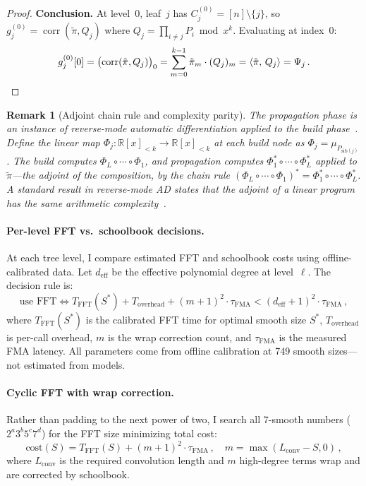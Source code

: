 \documentclass[11pt]{article}
\newtheorem{remark}[theorem]{Remark}
\DeclareMathOperator{\corr}{corr}
\newcommand{\ip}[2]{\langle #1,\, #2 \rangle}
\begin{document}
\begin{proof}
\textbf{Conclusion.} At level~$0$, leaf~$j$ has
$C_j^{(0)} = [n] \setminus \{j\}$, so
$g^{(0)}_j = \corr(\tilde\pi, Q_j)$ where $Q_j = \prod_{i \ne j} P_i
\bmod x^k$.  Evaluating at index~$0$:
\[
  g^{(0)}_j[0]
  = \bigl(\corr(\tilde\pi, Q_j)\bigr)_0
  = \sum_{m=0}^{k-1} \tilde\pi_m \cdot (Q_j)_m
  = \ip{\tilde\pi}{Q_j}
  = \Psi_j\,.\qedhere
\]
\end{proof}

\begin{remark}[Adjoint chain rule and complexity parity]
\label{rem:adjoint-chain}
The propagation phase is an instance of reverse-mode automatic
differentiation applied to the build phase~\citep{griewank2008}.
Define the linear map $\Phi_j \colon \mathbb{R}[x]_{<k} \to
\mathbb{R}[x]_{<k}$ at each build node as $\Phi_j = \mu_{P_{\mathrm{sib}(j)}}$.
The build computes $\Phi_L \circ \cdots \circ \Phi_1$, and propagation
computes $\Phi_1^* \circ \cdots \circ \Phi_L^*$ applied to
$\tilde\pi$---the adjoint of the composition, by the chain rule
$(\Phi_L \circ \cdots \circ \Phi_1)^* = \Phi_1^* \circ \cdots \circ
\Phi_L^*$.  A standard result in reverse-mode AD states that the adjoint
of a linear program has the same arithmetic
complexity~\citep[Theorem~3.1]{griewank2008}.
\end{remark}

\paragraph{Per-level FFT vs.\ schoolbook decisions.}
At each tree level, I compare estimated FFT and schoolbook costs using
offline-calibrated data. Let $d_{\text{eff}}$ be the effective polynomial
degree at level~$\ell$. The decision rule is:
\begin{equation}\label{eq:fft-decision}
  \text{use FFT} \iff
    T_{\text{FFT}}(S^*) + T_{\text{overhead}} + (m+1)^2 \cdot \tau_{\text{FMA}}
    < (d_{\text{eff}}+1)^2 \cdot \tau_{\text{FMA}}\,,
\end{equation}
where $T_{\text{FFT}}(S^*)$ is the calibrated FFT time for optimal
smooth size $S^*$, $T_{\text{overhead}}$ is per-call overhead, $m$ is the
wrap correction count, and $\tau_{\text{FMA}}$ is the measured FMA latency.
All parameters come from offline calibration at 749 smooth sizes---not
estimated from models.

\paragraph{Cyclic FFT with wrap correction.}
Rather than padding to the next power of two, I search all 7-smooth
numbers ($2^a 3^b 5^c 7^d$) for the FFT size minimizing total cost:
\begin{equation}\label{eq:wrap-cost}
  \text{cost}(S) = T_{\text{FFT}}(S) + (m+1)^2 \cdot \tau_{\text{FMA}}\,,
  \quad m = \max(L_{\text{conv}} - S, 0)\,,
\end{equation}
where $L_{\text{conv}}$ is the required convolution length and
$m$ high-degree terms wrap and are corrected by schoolbook.
\end{document}
